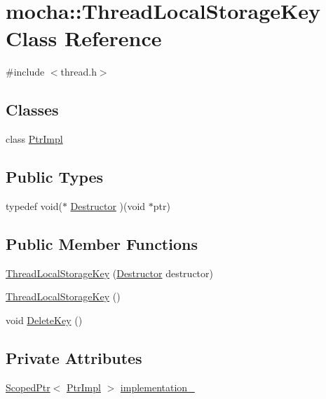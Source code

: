 \hypertarget{classmocha_1_1_thread_local_storage_key}{
\section{mocha::ThreadLocalStorageKey Class Reference}
\label{classmocha_1_1_thread_local_storage_key}
}


{\ttfamily \#include $<$thread.h$>$}

\subsection*{Classes}
\begin{DoxyCompactItemize}
\item 
class \hyperlink{classmocha_1_1_thread_local_storage_key_1_1_ptr_impl}{PtrImpl}
\end{DoxyCompactItemize}
\subsection*{Public Types}
\begin{DoxyCompactItemize}
\item 
typedef void($\ast$ \hyperlink{classmocha_1_1_thread_local_storage_key_a4355b1fd8f48df1214686f56bd666897}{Destructor} )(void $\ast$ptr)
\end{DoxyCompactItemize}
\subsection*{Public Member Functions}
\begin{DoxyCompactItemize}
\item 
\hyperlink{classmocha_1_1_thread_local_storage_key_aa52951305452338895ff7e25bde8296b}{ThreadLocalStorageKey} (\hyperlink{classmocha_1_1_thread_local_storage_key_a4355b1fd8f48df1214686f56bd666897}{Destructor} destructor)
\item 
\hyperlink{classmocha_1_1_thread_local_storage_key_a4c84897d65eb9de1e596b77f93ed43ff}{ThreadLocalStorageKey} ()
\item 
void \hyperlink{classmocha_1_1_thread_local_storage_key_aa45430633476009152891f068a1d1ce4}{DeleteKey} ()
\end{DoxyCompactItemize}
\subsection*{Private Attributes}
\begin{DoxyCompactItemize}
\item 
\hyperlink{classmocha_1_1_scoped_ptr}{ScopedPtr}$<$ \hyperlink{classmocha_1_1_thread_local_storage_key_1_1_ptr_impl}{PtrImpl} $>$ \hyperlink{classmocha_1_1_thread_local_storage_key_ae0fd5c5d19e230f749241ba7d58a1198}{implementation\_\-}
\end{DoxyCompactItemize}
